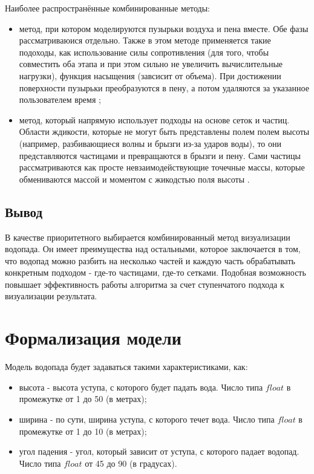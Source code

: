 Наиболее распространённые комбинированные методы:
\begin{itemize} 
    \item метод, при котором моделируются пузырьки воздуха и пена вместе. Обе фазы рассматриваюися отдельно. Также в этом методе применяется такие подоходы, как использование силы сопротивления (для того, чтобы совместить оба этапа и при этом сильно не увеличить вычислительные нагрузки), функция насыщения (завсисит от объема). При достижении поверхности пузырьки преобразуются в пену, а потом удаляются за указанное пользователем время \cite{sph-combo};
    \item метод, который напрямую использует подходы на основе сеток и частиц. Области ждикости, которые не могут быть представлены полем полем высоты (например, разбивающиеся волны и брызги из-за ударов воды), то они представляются частицами и превращаются в брызги и пену. Сами частицы рассматриваются как просте невзаимодействующие точечные массы, которые обмениваются массой и моментом с жикодстью поля высоты  \cite{real-time-combo}.
\end{itemize}


\subsection*{Вывод}
В качестве приоритетного выбирается комбинированный метод визуализации водопада. Он имеет преимущества над остальными, которое заключается в том, что водопад можно разбить на несколько частей и каждую часть обрабатывать конкретным подходом - где-то частицами, где-то сетками. Подобная возможность повышает эффективность работы алгоритма за счет ступенчатого подхода к визуализации результата. 


\section{Формализация модели}
Модель водопада будет задаваться такими характеристиками, как:
\begin{itemize} 
    \item высота - высота уступа, с которого будет падать вода. Число типа $float$ в промежутке от 1 до 50 (в метрах);
    \item ширина - по сути, ширина уступа, с которого течет вода. Число типа $float$ в промежутке от 1 до 10 (в метрах);
    \item угол падения - угол, который зависит от уступа, с которого падает водопад. Число типа $float$ от 45 до 90 (в градусах).
\end{itemize}

